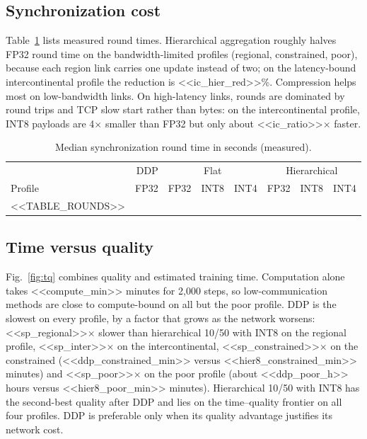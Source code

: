 \documentclass[conference]{IEEEtran}
\begin{document}
\subsection{Synchronization cost}
Table~\ref{tab:rounds} lists measured round times. Hierarchical aggregation roughly halves FP32 round time on the bandwidth-limited profiles (regional, constrained, poor), because each region link carries one update instead of two; on the latency-bound intercontinental profile the reduction is <<ic_hier_red>>\%. Compression helps most on low-bandwidth links. On high-latency links, rounds are dominated by round trips and TCP slow start rather than bytes: on the intercontinental profile, INT8 payloads are 4$\times$ smaller than FP32 but only about <<ic_ratio>>$\times$ faster.

\begin{table}[t]
\caption{Median synchronization round time in seconds (measured).}
\label{tab:rounds}
\centering\footnotesize\setlength{\tabcolsep}{3.5pt}
\begin{tabular}{@{}lrrrrrrr@{}}
\toprule
 & DDP & \multicolumn{3}{c}{Flat} & \multicolumn{3}{c}{Hierarchical} \\
\cmidrule(lr){2-2}\cmidrule(lr){3-5}\cmidrule(lr){6-8}
Profile & FP32 & FP32 & INT8 & INT4 & FP32 & INT8 & INT4 \\
\midrule
<<TABLE_ROUNDS>>
\bottomrule
\end{tabular}
\end{table}

\subsection{Time versus quality}
Fig.~\ref{fig:tq} combines quality and estimated training time. Computation alone takes <<compute_min>> minutes for 2,000 steps, so low-communication methods are close to compute-bound on all but the poor profile. DDP is the slowest on every profile, by a factor that grows as the network worsens: <<sp_regional>>$\times$ slower than hierarchical 10/50 with INT8 on the regional profile, <<sp_inter>>$\times$ on the intercontinental, <<sp_constrained>>$\times$ on the constrained (<<ddp_constrained_min>> versus <<hier8_constrained_min>> minutes) and <<sp_poor>>$\times$ on the poor profile (about <<ddp_poor_h>> hours versus <<hier8_poor_min>> minutes). Hierarchical 10/50 with INT8 has the second-best quality after DDP and lies on the time--quality frontier on all four profiles. DDP is preferable only when its quality advantage justifies its network cost.
\end{document}
